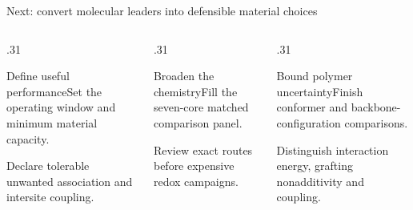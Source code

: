 \begin{frame}{Next: convert molecular leaders into defensible material choices}
\begin{columns}[T]
\begin{column}{.31\textwidth}\begin{block}{Define useful performance}\large Set the operating window and minimum material capacity.\par\medskip\small Declare tolerable unwanted association and intersite coupling.\end{block}\end{column}
\begin{column}{.31\textwidth}\begin{block}{Broaden the chemistry}\large Fill the seven-core matched comparison panel.\par\medskip\small Review exact routes before expensive redox campaigns.\end{block}\end{column}
\begin{column}{.31\textwidth}\begin{block}{Bound polymer uncertainty}\large Finish conformer and backbone-configuration comparisons.\par\medskip\small Distinguish interaction energy, grafting nonadditivity and coupling.\end{block}\end{column}
\end{columns}
\end{frame}
